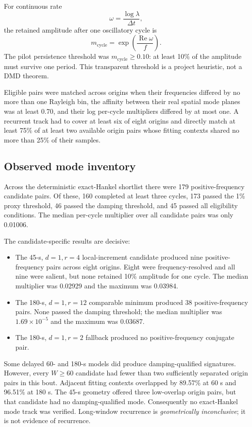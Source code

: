 \documentclass[11pt]{article}
\begin{document}
For continuous rate
\[
\omega=\frac{\log\lambda}{\Delta t},
\]
the retained amplitude after one oscillatory cycle is
\[
m_{\mathrm{cycle}}
=\exp\left(\frac{\operatorname{Re}\omega}{f}\right).
\]
The pilot persistence threshold was \(m_{\mathrm{cycle}}\geq0.10\): at least
10\% of the amplitude must survive one period.  This transparent threshold is
a project heuristic, not a DMD theorem.

Eligible pairs were matched across origins when their frequencies differed
by no more than one Rayleigh bin, the affinity between their real spatial
mode planes was at least 0.70, and their log per-cycle multipliers differed by
at most one.  A recurrent track had to cover at least six of eight origins
and directly match at least 75\% of at least two available origin pairs whose
fitting contexts shared no more than 25\% of their samples.

\subsection{Observed mode inventory}

Across the deterministic exact-Hankel shortlist there were 179
positive-frequency candidate pairs.  Of these, 160 completed at least three
cycles, 173 passed the 1\% proxy threshold, 46 passed the damping threshold,
and 45 passed all eligibility conditions.  The median per-cycle multiplier
over all candidate pairs was only 0.01006.

The candidate-specific results are decisive:
\begin{itemize}
\item The 45-s, \(d=1,r=4\) local-increment candidate produced nine
positive-frequency pairs across eight origins.  Eight were frequency-resolved
and all nine were salient, but none retained 10\% amplitude for one cycle.
The median multiplier was 0.02929 and the maximum was 0.03984.
\item The 180-s, \(d=1,r=12\) comparable minimum produced 38
positive-frequency pairs.  None passed the damping threshold; the median
multiplier was \(1.69\times10^{-5}\) and the maximum was 0.03687.
\item The 180-s, \(d=1,r=2\) fallback produced no positive-frequency
conjugate pair.
\end{itemize}

Some delayed 60- and 180-s models did produce damping-qualified signatures.
However, every \(W\geq60\) candidate had fewer than two sufficiently
separated origin pairs in this bout.  Adjacent fitting contexts overlapped by
89.57\% at 60 s and 96.51\% at 180 s.  The 45-s geometry offered three
low-overlap origin pairs, but that candidate had no damping-qualified mode.
Consequently no exact-Hankel mode track was verified.  Long-window recurrence
is \emph{geometrically inconclusive}; it is not evidence of recurrence.
\end{document}
